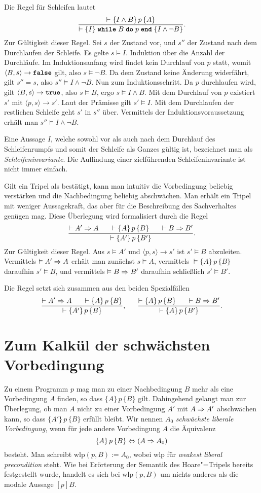 Die Regel für Schleifen lautet
\[\dfrac{\vdash\{I\land B\}\,p\,\{A\}}
{\vdash\{I\}\;\kw{while}\;B\;\kw{do}\;p\;\kw{end}\;\{I\land\lnot B\}}.\]
Zur Gültigkeit dieser Regel. Sei $s$ der Zustand vor, und $s''$
der Zustand nach dem Durchlaufen der Schleife. Es gelte $s\models I$.
Induktion über die Anzahl der Durchläufe. Im Induktionsanfang wird findet
kein Durchlauf von  $p$ statt, womit $\langle B,s\rangle\to\kw{false}$
gilt, also $s\models\lnot B$. Da dem Zustand keine Änderung widerfährt,
gilt $s''=s$, also $s''\models I\land\lnot B$.
Nun zum Induktionsschritt. Da $p$ durchlaufen wird, gilt
$\langle B,s\rangle\to\kw{true}$, also $s\models B$,
ergo $s\models I\land B$. Mit dem Durchlauf von $p$ existiert
$s'$ mit $\langle p,s\rangle\to s'$. Laut der Prämisse gilt
$s'\models I$. Mit dem Durchlaufen der restlichen Schleife geht $s'$
in $s''$ über. Vermittels der Induktionsvoraussetzung erhält man
$s''\models I\land\lnot B$.

Eine Aussage $I$, welche sowohl vor als auch nach dem Durchlauf des
Schleifenrumpfs und somit der Schleife als Ganzes gültig ist, bezeichnet
man als \emph{Schleifeninvariante}. Die Auffindung einer zielführenden
Schleifeninvariante ist nicht immer einfach.

Gilt ein Tripel als bestätigt, kann man intuitiv die Vorbedingung beliebig
verstärken und die Nachbedingung beliebig abschwächen. Man erhält ein
Tripel mit weniger Aussagekraft, das aber für die Beschreibung des
Sachverhaltes genügen mag. Diese Überlegung wird formalisiert durch
die Regel
\[\dfrac{\vdash A'\Rightarrow A\quad\;\;\vdash\{A\}\,p\,\{B\}\quad\;\;\vdash B\Rightarrow B'}
{\vdash\{A'\}\,p\,\{B'\}}.\]
Zur Gültigkeit dieser Regel. Aus $s\models A'$ und
$\langle p,s\rangle\to s'$ ist $s'\models B$ abzuleiten.
Vermittels $\vDash A'\Rightarrow A$ erhält man zunächst $s\models A$,
vermittels $\models\{A\}\,p\,\{B\}$ daraufhin $s'\models B$,
und vermittels $\vDash B\Rightarrow B'$ daraufhin schließlich $s'\models B'$.

Die Regel setzt sich zusammen aus den beiden Spezialfällen
\[\dfrac{\vdash A'\Rightarrow A\quad\;\;\vdash\{A\}\,p\,\{B\}}
{\vdash\{A'\}\,p\,\{B\}},\quad\;\;
\dfrac{\vdash\{A\}\,p\,\{B\}\quad\;\;\vdash B\Rightarrow B'}
{\vdash\{A\}\,p\,\{B'\}}.\]

\section{Zum Kalkül der schwächsten Vorbedingung}

Zu einem Programm $p$ mag man zu einer Nachbedingung $B$ mehr als eine
Vorbedingung $A$ finden, so dass $\{A\}\,p\,\{B\}$ gilt. Dahingehend
gelangt man zur Überlegung, ob man $A$ nicht zu einer Vorbedingung $A'$
mit $A\Rightarrow A'$ abschwächen kann, so dass $\{A'\}\,p\,\{B\}$ erfüllt
bleibt. Wir nennen $A_0$ \emph{schwächste liberale Vorbedingung},
wenn für jede andere Vorbedingung $A$ die Äquivalenz
\[\{A\}\,p\,\{B\}\Leftrightarrow (A\Rightarrow A_0)\]
besteht. Man schreibt $\mathrm{wlp}(p,B):=A_0$, wobei $\mathrm{wlp}$ für
\emph{weakest liberal precondition} steht. Wie bei Erörterung der
Semantik des Hoare"=Tripels bereits festgestellt wurde, handelt es sich
bei $\mathrm{wlp}(p,B)$ um nichts anderes als die modale Aussage $[p]B$.

